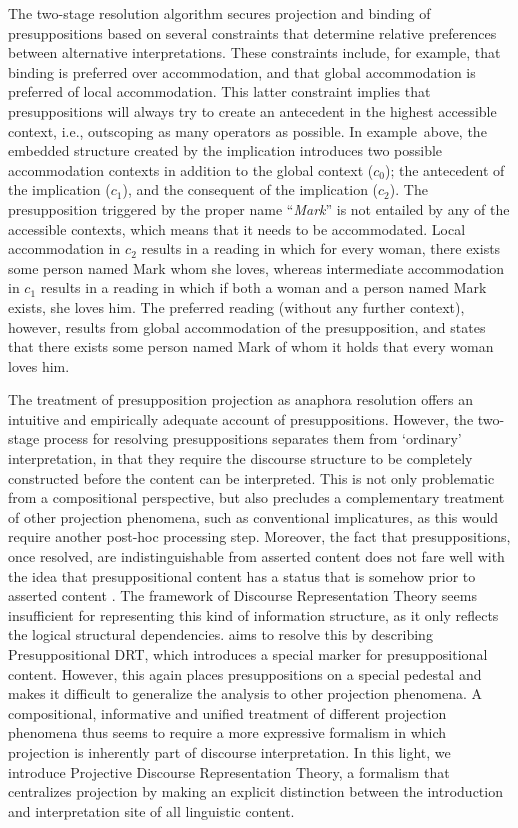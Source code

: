 \noindent The two-stage resolution algorithm secures projection and binding
of presuppositions based on several constraints that determine relative
preferences between alternative interpretations. These constraints include,
for example, that binding is preferred over accommodation, and that global
accommodation is preferred of local accommodation. This latter constraint
implies that presuppositions will always try to create an antecedent in the
highest accessible context, i.e., outscoping as many operators as possible.
In example~\Last above, the embedded structure created by the implication
introduces two possible accommodation contexts in addition to the global
context ($c_0$); the antecedent of the implication ($c_1$), and the
consequent of the implication ($c_2$). The presupposition triggered by the
proper name ``\textit{Mark}'' is not entailed by any of the accessible
contexts, which means that it needs to be accommodated. Local accommodation
in $c_2$ results in a reading in which for every woman, there exists some
person named Mark whom she loves, whereas intermediate accommodation in
$c_1$ results in a reading in which if both a woman and a person named Mark
exists, she loves him. The preferred reading (without any further context),
however, results from global accommodation of the presupposition, and states
that there exists some person named Mark of whom it holds that every woman
loves him.

The treatment of presupposition projection as anaphora resolution offers an
intuitive and empirically adequate account of presuppositions. However, the
two-stage process for resolving presuppositions separates them from
`ordinary' interpretation, in that they require the discourse structure to
be completely constructed before the content can be interpreted. This is not
only problematic from a compositional perspective, but also precludes
a complementary treatment of other projection phenomena, such as
conventional implicatures, as this would require another post-hoc processing
step. Moreover, the fact that presuppositions, once resolved, are
indistinguishable from asserted content does not fare well with the idea
that presuppositional content has a status that is somehow prior to asserted
content \cite{kracht1994logic,krahmer1998presupposition}. The framework of
Discourse Representation Theory seems insufficient for representing this
kind of information structure, as it only reflects the logical structural
dependencies.  aims to resolve this by
describing Presuppositional DRT, which introduces a special marker for
presuppositional content. However, this again places presuppositions on
a special pedestal and makes it difficult to generalize the analysis to
other projection phenomena. A compositional, informative and unified
treatment of different projection phenomena thus seems to require a more
expressive formalism in which projection is inherently part of discourse
interpretation. In this light, we introduce Projective Discourse
Representation Theory, a formalism that centralizes projection by making an
explicit distinction between the introduction and interpretation site of all
linguistic content.

